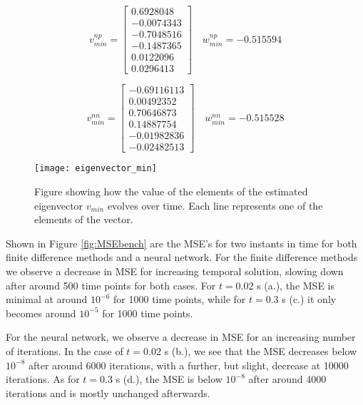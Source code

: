  \begin{equation*}
	 v_{min}^{np} = \begin{bmatrix}
	  0.6928048 \\
	 -0.0074343 \\
	 -0.7048516 \\
	 -0.1487365 \\
	 0.0122096 \\
	 0.0296413
	 \end{bmatrix} \quad w_{min}^{np} = -0.515594
 \end{equation*}

 \begin{equation*}
	 v_{min}^{nn} = \begin{bmatrix}
	  -0.69116113  \\
	  0.00492352  \\
	  0.70646873  \\
	  0.14887754 \\
	  -0.01982836 \\
	  -0.02482513
	 \end{bmatrix} \quad w_{min}^{nn} = -0.515528
 \end{equation*}



 \begin{figure}[htbp]
 	\centering
 	\texttt{[image: eigenvector\_min]}
 	\caption{Figure showing how the value of the elements of the estimated eigenvector $v_{min}$ evolves over time. Each line represents one of the elements of the vector.}
 	\label{fig:eigenvector_min}
 \end{figure}

Shown in Figure \ref{fig:MSEbench} are the MSE's for two instants in time for both finite difference methods and a neural network. For the finite difference methods we observe a decrease in MSE for increasing temporal solution, slowing down after around 500 time points for both cases. For $t=0.02$ s (a.), the MSE is minimal at around $10^{-6}$ for 1000 time points, while for $t=0.3$ s (c.) it only becomes around $10^{-5}$ for 1000 time points.

For the neural network, we observe a decrease in MSE for an increasing number of iterations. In the case of $t=0.02$ s (b.), we see that the MSE decreases below $10^{-8}$ after around 6000 iterations, with a further, but slight, decrease at 10000 iterations. As for $t=0.3$ s (d.), the MSE is below $10^{-8}$ after around 4000 iterations and is mostly unchanged afterwards.

